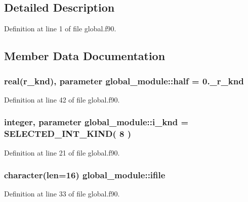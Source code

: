 \subsection{Detailed Description}


Definition at line 1 of file global.\-f90.



\subsection{Member Data Documentation}
\hypertarget{classglobal__module_aca3045154e42c1413c7e40cff43d609b}{
\subsubsection[{half}]{\setlength{\rightskip}{0pt plus 5cm}real({\bf r\-\_\-knd}), parameter global\-\_\-module\-::half = 0.\-\_\-r\-\_\-knd}}\label{classglobal__module_aca3045154e42c1413c7e40cff43d609b}


Definition at line 42 of file global.\-f90.

\hypertarget{classglobal__module_a01b861666154d8b3e5bd725ae8933438}{
\subsubsection[{i\-\_\-knd}]{\setlength{\rightskip}{0pt plus 5cm}integer, parameter global\-\_\-module\-::i\-\_\-knd = S\-E\-L\-E\-C\-T\-E\-D\-\_\-\-I\-N\-T\-\_\-\-K\-I\-N\-D( 8 )}}\label{classglobal__module_a01b861666154d8b3e5bd725ae8933438}


Definition at line 21 of file global.\-f90.

\hypertarget{classglobal__module_a94b80c776276c5e9e870df62cdc27b1d}{
\subsubsection[{ifile}]{\setlength{\rightskip}{0pt plus 5cm}character(len=16) global\-\_\-module\-::ifile}}\label{classglobal__module_a94b80c776276c5e9e870df62cdc27b1d}


Definition at line 33 of file global.\-f90.

